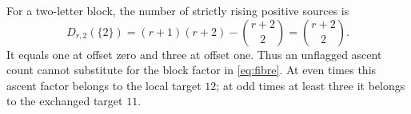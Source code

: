 \begin{example}
For a two-letter block, the number of strictly rising positive sources is
\[
 D_{r,2}(\{2\})=(r+1)(r+2)-\binom{r+2}{2}
               =\binom{r+2}{2}.
\]
It equals one at offset zero and three at offset one. Thus an unflagged
ascent count cannot substitute for the block factor in \eqref{eq:fibre}.
At even times this ascent factor belongs to the local target $12$;
at odd times at least three it belongs to the exchanged target $11$.
\end{example}
